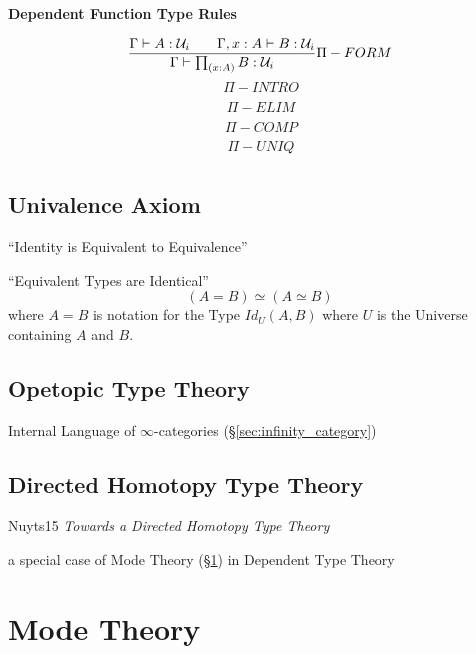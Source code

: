 \textbf{Dependent Function Type Rules}

\[
  {
    \frac
    {\Gamma \vdash A : \mathcal{U}_i \;\;\;\;\;\;\;
    \Gamma,x:A \vdash B : \mathcal{U}_i}
    {\Gamma \vdash \prod_{(x:A)} B : \mathcal{U}_i}
  } \Pi-FORM
\]\[
  {
    \frac
    {}
    {}
  } \Pi-INTRO
\]\[
  {
    \frac
    {}
    {}
  } \Pi-ELIM
\]\[
  {
    \frac
    {}
    {}
  } \Pi-COMP
\]\[
  {
    \frac
    {}
    {}
  } \Pi-UNIQ
\]



\subsection{Univalence Axiom}\label{sec:univalence_axiom}

``Identity is Equivalent to Equivalence''

``Equivalent Types are Identical''
\[
  (A = B) \simeq (A \simeq B)
\]
where $A = B$ is notation for the Type $Id_U(A,B)$ where $U$ is the
Universe containing $A$ and $B$.



\subsection{Opetopic Type Theory}\label{sec:opetopic_typetheory}

Internal Language of $\infty$-categories
(\S\ref{sec:infinity_category})



\subsection{Directed Homotopy Type Theory}\label{sec:directed_hott}

Nuyts15 \emph{Towards a Directed Homotopy Type Theory}

a special case of Mode Theory (\S\ref{sec:mode_theory}) in Dependent
Type Theory



\section{Mode Theory}\label{sec:mode_theory}

